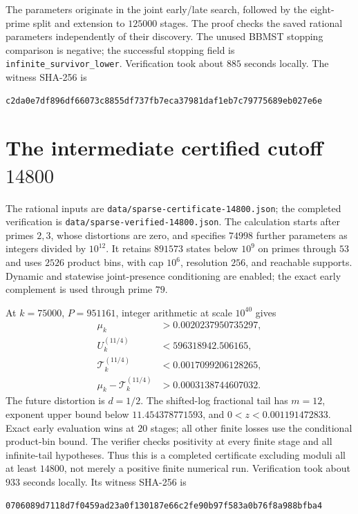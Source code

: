 \documentclass[11pt]{article}
\begin{document}
The parameters originate in the joint early/late search, followed by the
eight-prime split and extension to $125000$ stages. The proof checks the
saved rational parameters independently of their discovery. The unused
BBMST stopping comparison is negative; the successful stopping field is
\texttt{infinite\_survivor\_lower}. Verification took about $885$ seconds
locally. The witness SHA-256 is
\begin{lstlisting}[basicstyle=\ttfamily\scriptsize,breaklines=true]
c2da0e7df896df66073c8855df737fb7eca37981daf1eb7c79775689eb027e6e
\end{lstlisting}

\section{The intermediate certified cutoff $14800$}\label{sec:14800}
The rational inputs are \texttt{data/sparse-certificate-14800.json}; the
completed verification is \texttt{data/sparse-verified-14800.json}.
The calculation starts after primes $2,3$, whose distortions are zero,
and specifies $74998$ further parameters as integers divided by $10^{12}$.
It retains $891573$ states below $10^9$ on primes through $53$ and uses
$2526$ product bins, with cap $10^6$, resolution $256$, and reachable
supports. Dynamic and statewise joint-presence conditioning are enabled;
the exact early complement is used through prime $79$.

At $k=75000$, $P=951161$, integer arithmetic at scale $10^{40}$ gives
\begin{align*}
 \mu_k&>0.0020237950735297,\\
 U_k^{(11/4)}&<596318942.506165,\\
 \mathcal T_k^{(11/4)}&<0.0017099206128265,\\
 \mu_k-\mathcal T_k^{(11/4)}&>0.0003138744607032.
\end{align*}
The future distortion is $d=1/2$. The shifted-log fractional tail has
$m=12$, exponent upper bound below $11.454378771593$, and
$0<z<0.001191472833$. Exact early evaluation wins at $20$ stages;
all other finite losses use the conditional product-bin bound.
The verifier checks positivity at every finite stage and all infinite-tail
hypotheses. Thus this is a completed certificate excluding moduli all
at least $14800$, not merely a positive finite numerical run.
Verification took about $933$ seconds locally. Its witness SHA-256 is
\begin{lstlisting}[basicstyle=\ttfamily\scriptsize,breaklines=true]
0706089d7118d7f0459ad23a0f130187e66c2fe90b97f583a0b76f8a988bfba4
\end{lstlisting}
\end{document}

